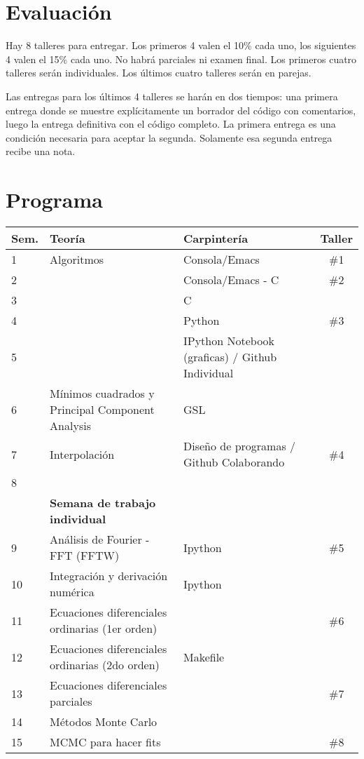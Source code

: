 \documentclass[12pt]{article}
\begin{document}
\section*{Evaluaci\'on}

Hay 8 talleres para entregar. Los primeros 4 valen el 10\% cada uno, los siguientes 4 valen el 15\% cada uno. No habr\'a parciales ni examen final. Los primeros cuatro talleres ser\'an individuales. Los \'ultimos cuatro talleres ser\'an en parejas. 

Las entregas para los \'ultimos 4 talleres se har\'an en dos tiempos: una primera entrega donde se muestre expl\'icitamente un borrador del c\'odigo con comentarios, luego la entrega definitiva con el c\'odigo completo. La primera entrega es una condici\'on necesaria para aceptar la segunda. Solamente esa segunda entrega recibe una nota.

 \newpage
\section*{Programa}

\begin{center}
\begin{tabular}{|p{1cm}|p{6cm}|p{5cm}|c|}
\hline
Sem. & Teor\'ia & Carpinter\'ia & Taller \\\hline
1 & Algoritmos	&Consola/Emacs & \#1\\
2 & 	& Consola/Emacs - C  & \#2\\
3 & 	&C  &    \\
4 & 	&Python & \#3\\
5 & 	&IPython Notebook (graficas) / Github Individual & \\
6 &      M\'inimos cuadrados y Principal Component Analysis & GSL & \\
7 &  Interpolaci\'on & Dise\~no de programas / Github Colaborando & \#4\\ 
8 &   & & \\
 & {\bf Semana de trabajo individual} & &\\
9 & An\'alisis de Fourier - FFT  (FFTW)&  Ipython & \#5 \\
10 & Integraci\'on y derivaci\'on num\'erica & Ipython &\\
11 & Ecuaciones diferenciales ordinarias (1er orden)& &\#6\\
12 & Ecuaciones diferenciales ordinarias (2do orden)&  Makefile & \ \\
13 & Ecuaciones diferenciales parciales &  & \#7\\
14 & M\'etodos Monte Carlo &   &  \\
15 & MCMC para hacer fits &    & \#8 \\

\hline
\end{tabular}
\end{center}
\end{document}
